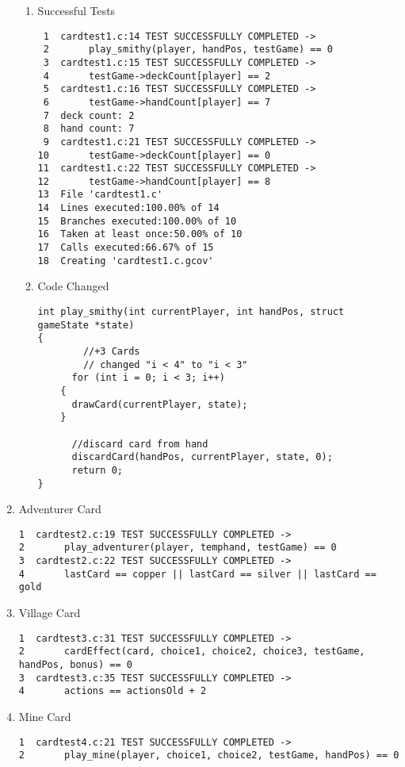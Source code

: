 \documentclass[11pt]{article}
\begin{document}
\begin{enumerate}
\begin{enumerate}
\item Successful Tests
\label{sec:successfultests}

\begin{verbatim}
 1  cardtest1.c:14 TEST SUCCESSFULLY COMPLETED ->
 2       play_smithy(player, handPos, testGame) == 0
 3  cardtest1.c:15 TEST SUCCESSFULLY COMPLETED ->
 4       testGame->deckCount[player] == 2
 5  cardtest1.c:16 TEST SUCCESSFULLY COMPLETED ->
 6       testGame->handCount[player] == 7
 7  deck count: 2
 8  hand count: 7
 9  cardtest1.c:21 TEST SUCCESSFULLY COMPLETED ->
10       testGame->deckCount[player] == 0
11  cardtest1.c:22 TEST SUCCESSFULLY COMPLETED ->
12       testGame->handCount[player] == 8
13  File 'cardtest1.c'
14  Lines executed:100.00% of 14
15  Branches executed:100.00% of 10
16  Taken at least once:50.00% of 10
17  Calls executed:66.67% of 15
18  Creating 'cardtest1.c.gcov'
\end{verbatim}

\item Code Changed
\label{sec:codechanged}

\begin{verbatim}
int play_smithy(int currentPlayer, int handPos, struct gameState *state)
{
        //+3 Cards
        // changed "i < 4" to "i < 3"
      for (int i = 0; i < 3; i++)
    {
      drawCard(currentPlayer, state);
    }
            
      //discard card from hand
      discardCard(handPos, currentPlayer, state, 0);
      return 0;
}
\end{verbatim}
\end{enumerate}


\item Adventurer Card
\label{sec:adventurercard}
\begin{verbatim}
1  cardtest2.c:19 TEST SUCCESSFULLY COMPLETED ->
2       play_adventurer(player, temphand, testGame) == 0
3  cardtest2.c:22 TEST SUCCESSFULLY COMPLETED ->
4       lastCard == copper || lastCard == silver || lastCard == gold
\end{verbatim}

\item Village Card
\label{sec:villagecard}
\begin{verbatim}
1  cardtest3.c:31 TEST SUCCESSFULLY COMPLETED ->
2       cardEffect(card, choice1, choice2, choice3, testGame, handPos, bonus) == 0
3  cardtest3.c:35 TEST SUCCESSFULLY COMPLETED ->
4       actions == actionsOld + 2
\end{verbatim}

\item Mine Card
\label{sec:minecard}
\begin{verbatim}
1  cardtest4.c:21 TEST SUCCESSFULLY COMPLETED ->
2       play_mine(player, choice1, choice2, testGame, handPos) == 0
\end{verbatim}
\end{enumerate}
\end{document}
